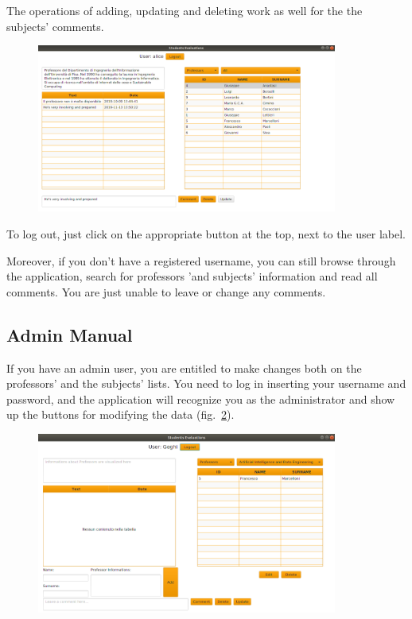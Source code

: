 \documentclass[a4paper, oneside]{article}
\begin{document}
The operations of adding, updating and deleting work as well for the the subjects' comments.
\begin{figure}[h]
\centering
\includegraphics[width=0.88\textwidth]{images/screens/screen5}
\label{fig:screen5}
\end{figure}

To log out, just click on the appropriate button at the top, next to the user label.

Moreover, if you don't have a registered username, you can still browse through the application, search for professors 'and subjects' information and read all comments. You are just unable to leave or change any comments.

\clearpage
\subsection{Admin Manual}
If you have an admin user, you are entitled to make changes both on the professors' and the subjects' lists. You need to log in inserting your username and password, and the application will recognize you as the administrator and show up the buttons for modifying the data (fig.~\ref{fig:adminLogin}).

\begin{figure}[h]
\centering
\includegraphics[width=0.88\textwidth]{images/screens/adminLogin}
\label{fig:adminLogin}
\end{figure}
\end{document}
